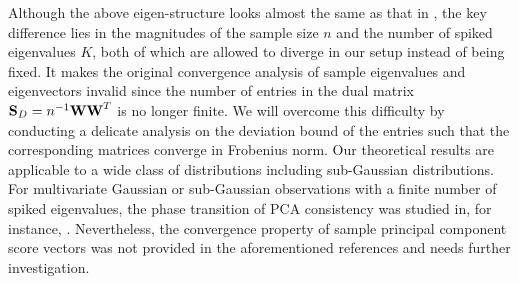 \documentclass{statsoc}
\newcommand{\bff}{\mbox{\bf f}}
\newcommand{\bu}{\mbox{\bf u}}
\newcommand{\bS}{\mbox{\bf S}}
\newcommand{\bW}{\mbox{\bf W}}
\newcommand{\bSig}{\mbox{\boldmath $\Sigma$}}
\def\t{^T}
\begin{document}
Although the above eigen-structure looks almost the same as that in \cite{Jung2009}, the key difference lies in the magnitudes of the sample size $n$ and the number of spiked eigenvalues $K$, both of which are allowed to diverge in our setup instead of being fixed. It makes the original convergence analysis of sample eigenvalues and eigenvectors invalid since the number of entries in the dual matrix $\bS_D = n^{-1} \bW \bW\t$ is no longer finite. We will overcome this difficulty by conducting a delicate analysis on the deviation bound of the entries such that the corresponding matrices converge in Frobenius norm. Our theoretical results are applicable to a wide class of distributions including sub-Gaussian distributions. For multivariate Gaussian or sub-Gaussian observations with a finite number of spiked eigenvalues, the phase transition of PCA consistency was studied in, for instance, \cite{Shen2016, Wang2017}. Nevertheless, the convergence property of sample principal component score vectors was not provided in the aforementioned references and needs further investigation.



\end{document}
